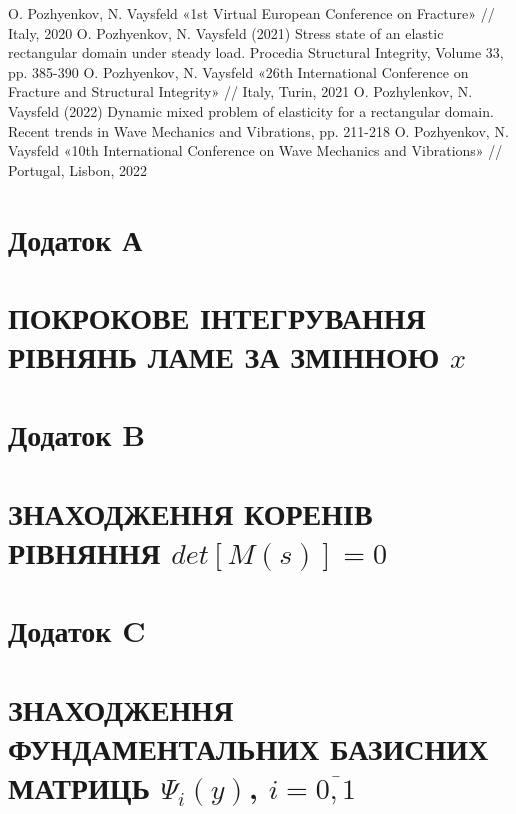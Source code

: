 \documentclass[a4paper,14pt]{extarticle}
\numberwithin{equation}{section}
\begin{document}
\begin{thebibliography}{1}
    O. Pozhyenkov, N. Vaysfeld «1st Virtual European Conference on Fracture» // Italy, 2020
    O. Pozhyenkov, N. Vaysfeld (2021) Stress state of an elastic rectangular domain under steady load. Procedia Structural Integrity, Volume 33, pp. 385-390
    O. Pozhyenkov, N. Vaysfeld «26th International Conference on Fracture and Structural Integrity» // Italy, Turin, 2021
    O. Pozhylenkov, N. Vaysfeld (2022) Dynamic mixed problem of elasticity for a rectangular domain. Recent trends in Wave Mechanics and Vibrations, pp. 211-218
    O. Pozhyenkov, N. Vaysfeld «10th International Conference on Wave Mechanics and Vibrations» // Portugal, Lisbon, 2022
\end{thebibliography}

\section*{\centering Додаток А}\label{ap_A}
\section*{\centering ПОКРОКОВЕ ІНТЕГРУВАННЯ РІВНЯНЬ ЛАМЕ ЗА ЗМІННОЮ $x$}


\section*{\centering Додаток B}\label{ap_B}
\section*{\centering ЗНАХОДЖЕННЯ КОРЕНІВ РІВНЯННЯ $det[M(s)]=0$}


\section*{\centering Додаток C}\label{ap_C}
\section*{\centering ЗНАХОДЖЕННЯ ФУНДАМЕНТАЛЬНИХ БАЗИСНИХ МАТРИЦЬ $\Psi_i(y)$, $i=\overline{0,1}$}

\end{document}
